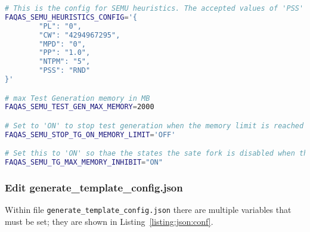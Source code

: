 \begin{lstlisting}[language=bash,label=listing:ASN:conf,caption=faqas\_semus\_conf.sh file for ASN case study.]
# This is the config for SEMU heuristics. The accepted values of 'PSS' are 'RND' for random and 'MDO' for minimum distance to output
FAQAS_SEMU_HEURISTICS_CONFIG='{
        "PL": "0",
        "CW": "4294967295",
        "MPD": "0",
        "PP": "1.0",
        "NTPM": "5",
        "PSS": "RND"
}'

# max Test Generation memory in MB
FAQAS_SEMU_TEST_GEN_MAX_MEMORY=2000

# Set to 'ON' to stop test generation when the memory limit is reached
FAQAS_SEMU_STOP_TG_ON_MEMORY_LIMIT='OFF'

# Set this to 'ON' so thae the states the sate fork is disabled when the memory limit is reached, to avoid going much over it
FAQAS_SEMU_TG_MAX_MEMORY_INHIBIT="ON"
\end{lstlisting}


\subsubsection{Edit generate\_template\_config.json}
\label{sec:json_config}

Within file \texttt{generate\_template\_config.json} there are multiple variables that must be set; they are shown in Listing~\ref{listing:json:conf}.

